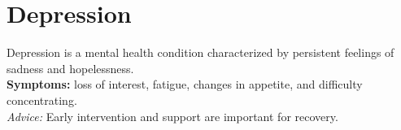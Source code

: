 \section*{Depression}
Depression is a mental health condition characterized by persistent feelings of sadness and hopelessness.\\
\textbf{Symptoms:} loss of interest, fatigue, changes in appetite, and difficulty concentrating.\\
\textit{Advice:} Early intervention and support are important for recovery.\\ 